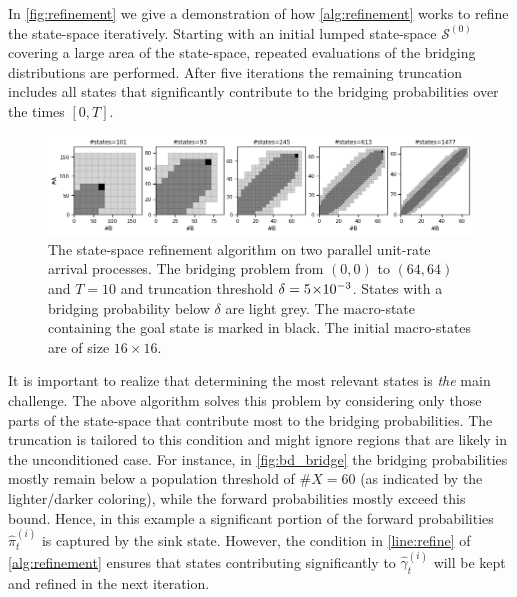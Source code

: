 In \autoref{fig:refinement} we give a demonstration of how
\autoref{alg:refinement} works to refine the state-space
iteratively. Starting with an initial lumped state-space
$\mathcal{S}^{(0)}$ covering a large area of the state-space,
repeated evaluations of the bridging distributions are performed.
After five iterations the remaining truncation includes all states
that significantly contribute to the bridging
probabilities over the times $[0,T]$.
\begin{figure}[tb]
  \centering
  \includegraphics[width=\textwidth]{gfx/refinement.png}
  \caption[State-space refinement algorithm on two parallel unit-rate
  arrival processes]{The state-space refinement algorithm on two
    parallel unit-rate arrival processes. The bridging problem from
    $(0,0)$ to $(64, 64)$ and $T=10$ and truncation threshold
    $\delta= 5\!\times\hspace{-.5ex} 10^{-3} $. States with a bridging probability below
    $\delta$ are light grey. The macro-state containing the goal state
  is marked in black. The initial macro-states are of size $16\times 16$.}
  \label{fig:refinement}
\end{figure}

It is important to realize that determining the most relevant states
is \emph{the} main challenge.
The above algorithm solves this problem by considering only those
parts of the state-space that contribute most to the bridging probabilities.
The truncation is tailored to this condition and might ignore regions
that are likely in the unconditioned case.
For instance, in \autoref{fig:bd_bridge} the bridging probabilities
mostly remain below a population threshold of $\#X=60$ (as indicated
by the lighter/darker coloring), while the forward probabilities
mostly exceed this bound. Hence, in this example a significant
portion of the forward probabilities $\hat\pi_t^{(i)}$
is captured by the sink state. However, the condition in
\autoref{line:refine} of \autoref{alg:refinement} ensures that
states contributing significantly to $\hat\gamma_t^{(i)}$ will be
kept and refined in the next iteration.


